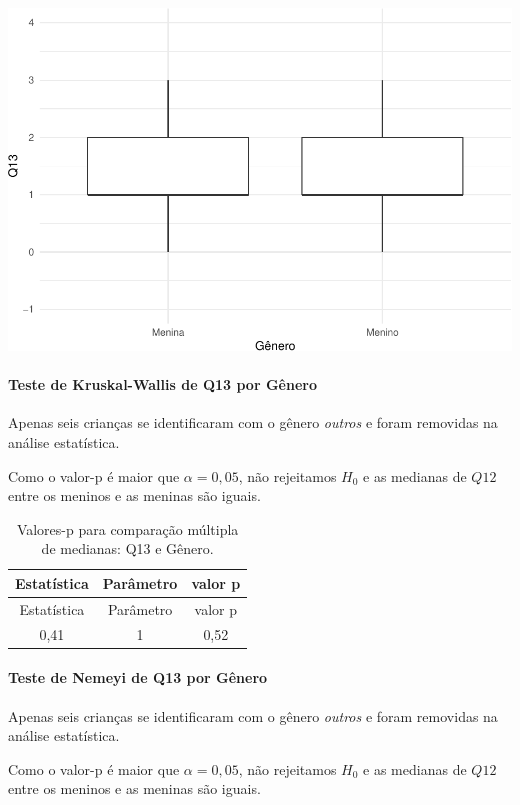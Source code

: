 \documentclass[]{article}
\let\oldparagraph\paragraph
\renewcommand{\paragraph}[1]{\oldparagraph{#1}\mbox{}}
\begin{document}
\begin{center}\includegraphics[width=0.75\linewidth]{relatorio_files/figure-latex/unnamed-chunk-66-1} \end{center}

\hypertarget{teste-de-kruskal-wallis-de-q13-por-guxeanero}{%
\paragraph{Teste de Kruskal-Wallis de Q13 por Gênero}\label{teste-de-kruskal-wallis-de-q13-por-guxeanero}}

Apenas seis crianças se identificaram com o gênero \emph{outros} e foram removidas na análise estatística.

Como o valor-p é maior que \(\alpha=0,05\), não rejeitamos \(H_0\) e as medianas de \(Q12\) entre os meninos e as meninas são iguais.

\begin{longtable}[]{@{}ccc@{}}
\caption{\label{tab:unnamed-chunk-67}Valores-p para comparação múltipla de medianas: Q13 e Gênero.}\tabularnewline
\toprule
Estatística & Parâmetro & valor p\tabularnewline
\midrule
\endfirsthead
\toprule
Estatística & Parâmetro & valor p\tabularnewline
\midrule
\endhead
0,41 & 1 & 0,52\tabularnewline
\bottomrule
\end{longtable}

\hypertarget{teste-de-nemeyi-de-q13-por-guxeanero}{%
\paragraph{Teste de Nemeyi de Q13 por Gênero}\label{teste-de-nemeyi-de-q13-por-guxeanero}}

Apenas seis crianças se identificaram com o gênero \emph{outros} e foram removidas na análise estatística.

Como o valor-p é maior que \(\alpha=0,05\), não rejeitamos \(H_0\) e as medianas de \(Q12\) entre os meninos e as meninas são iguais.
\end{document}
